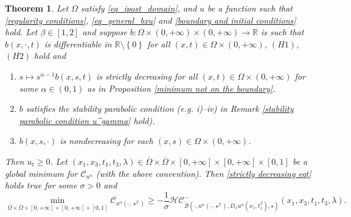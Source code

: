 \documentclass[11pt, reqno]{amsart}
\newtheorem{theorem}[lemma]{Theorem}
\theoremstyle{definition}
\numberwithin{equation}{section}
\newcommand{\Omegabar}{\overline{\Omega}}
\newcommand{\Btilde}{\widetilde{\mathscr{B}}}
\newcommand{\R}{\mathbb{R}}
\begin{document}
\begin{theorem}\label{approximate concavity parabolic with boundary conditions}
	Let $\Omega$ satisfy \eqref{eq_ipost_domain}, and $u$ be a function such that \eqref{regularity conditions}, \eqref{eq_general_bxu} and \eqref{boundary and initial conditions} hold. 
	Let $\beta \in [1,2]$ and suppose $b\colon\Omega\times(0,+\infty)\times (0,+\infty)\to \R$ is such that $b(x,\cdot, t)$ is differentiable in $\R\setminus \left\{0\right\}$ for all $(x,t)\in \Omega \times (0,+\infty)$, \hyperlink{H1}{\( (H1) \)}, \hyperlink{H2}{\( (H2) \)} hold and
	\begin{enumerate}[label=\textit{\roman*})]
	 \item $s \mapsto s^{\alpha-1}b(x,s, t)$ is strictly decreasing for all $(x,t)\in \Omega \times (0,+\infty)$ for some $\alpha \in (0,1)$ as in Proposition \ref{minimum not on the boundary}. 
		\item $b$ satisfies the stability parabolic condition (e.g. \textit{i})--\textit{iv}) in Remark \ref{stability parabolic condition u^gamma} hold). 
		\item $b(x, s, \cdot)$	is nondecreasing for each $(x,s) \in \Omega \times (0,+\infty)$.
	\end{enumerate}
Then $u_t \geq 0$.
	Let $(x_1,x_3,t_1,t_3,\lambda)\in \Omegabar\times \Omegabar\times [0,+\infty]\times [0,+\infty]\times [0,1]$ be a global minimum for $\mathcal{C}_{u^\alpha}$ (with the above convention).
Then \eqref{strictly decreasing eqt} holds true for some $\sigma>0$ and
\begin{equation*}
 \min_{\Omegabar\times \Omegabar\times[0,+\infty]\times [0,+\infty]\times[0,1]}\mathcal{C}_{u^\alpha(\cdot, \star^{\beta})} \geq -\frac{1}{\sigma}\mathcal{HC}^-_{\Btilde(\cdot, u^\alpha(\cdot,\star^{\beta}),D_xu^\alpha(x_1,t_1^{\beta}), \star)}(x_1,x_3,t_1,t_3,\lambda).
 \end{equation*}
\end{theorem}
\end{document}
